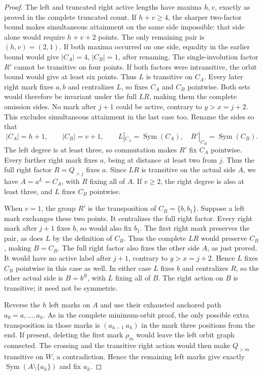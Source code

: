\documentclass[11pt,a4paper]{article}
\newcommand{\Sym}{\operatorname{Sym}}
\begin{document}
\begin{proof}
The left and truncated right active lengths have
maxima $h,v$, exactly as proved in the complete
truncated count. If $h+v\ge4$, the sharper two-factor bound
makes simultaneous attainment on the same side
impossible: that side alone would require
$h+v+2$ points. The only remaining pair is
$(h,v)=(2,1)$. If both maxima occurred on one
side, equality in the earlier bound would give
$|C_A|=4$, $|C_B|=1$, after renaming. The
single-involution factor $R'$ cannot be transitive
on four points. If both factors were intransitive,
the orbit bound would give at least six points.
Thus $L$ is transitive on $C_A$. Every later
right mark fixes $a,b$ and centralizes $L$,
so fixes $C_A$ and $C_B$ pointwise. Both sets
would therefore be invariant under the full
$LR$, making them the complete omission sides.
No mark after $j+1$ could be active, contrary
to $y>x=j+2$. This excludes simultaneous
attainment in the last case too. Rename the sides so that
\[
 |C_A|=h+1,\qquad |C_B|=v+1,
 \qquad L|_{C_A}=\Sym(C_A),\quad R'|_{C_B}=\Sym(C_B).
\]
The left degree is at least three, so commutation
makes $R'$ fix $C_A$ pointwise. Every further
right mark fixes $a$, being at distance at least
two from $j$. Thus the full right factor
$R=Q_{>j}$ fixes $a$. Since $LR$ is transitive
on the actual side $A$, we have $A=a^L=C_A$,
with $R$ fixing all of $A$.
If $v\ge2$, the right degree is also at least
three, and $L$ fixes $C_B$ pointwise.

When $v=1$, the group $R'$ is the transposition
of $C_B=\{b,b_1\}$. Suppose a left mark exchanges
these two points. It centralizes the full right
factor. Every right mark after $j+1$ fixes $b$,
so would also fix $b_1$. The first right mark
preserves the pair, as does $L$ by the definition
of $C_B$. Thus the complete $LR$ would preserve
$C_B$, making $B=C_B$. The full right factor
also fixes the other side $A$, as just proved.
It would have no active label after $j+1$,
contrary to $y>x=j+2$. Hence $L$ fixes $C_B$
pointwise in this case as well.
In either case $L$ fixes $b$ and centralizes
$R$, so the other actual side is $B=b^R$, with
$L$ fixing all of $B$. The right action on $B$
is transitive; it need not be symmetric.

Reverse the $h$ left marks on $A$ and use their
exhausted anchored path $a_0=a,\ldots,a_h$.
As in the complete minimum-orbit proof, the
only possible extra transposition in those marks
is $(a_{h-1}\ a_h)$ in the mark three positions
from the end. If present, deleting the first
mark $\rho_m$ would leave the left orbit graph
connected. The crossing and the transitive
right action would then make $Q_{>m}$ transitive
on $W$, a contradiction. Hence the remaining
left marks give exactly $\Sym(A\setminus\{a_h\})$
and fix $a_h$.


\end{proof}
\end{document}
